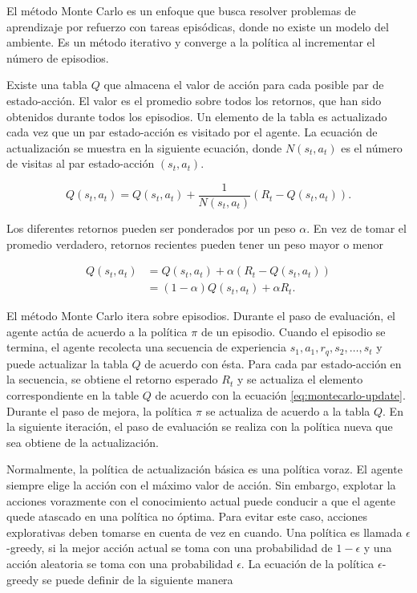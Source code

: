 El método Monte Carlo es un enfoque que busca resolver problemas
de aprendizaje por refuerzo con tareas episódicas, donde 
no existe un modelo del ambiente. 
Es un método iterativo y converge a la política
al incrementar el número de episodios.

Existe una tabla $Q$ que almacena el valor de acción para cada posible
par de estado-acción. El valor es el promedio sobre
todos los retornos, que han sido obtenidos durante todos los episodios. 
Un elemento de la tabla es actualizado cada vez que un par estado-acción
es visitado por el agente. La ecuación de actualización se muestra en la 
siguiente ecuación, donde $N(s_t, a_t)$ es el número de visitas al 
par estado-acción $(s_t, a_t)$.

\[
Q(s_t, a_t) = Q(s_t, a_t) + \frac{1}{N(s_t, a_t)} (R_t - Q(s_t, a_t)).
\]

Los diferentes retornos pueden 
ser ponderados por un peso $\alpha$.
En vez de tomar el promedio
verdadero, retornos recientes pueden tener un peso mayor o menor

\begin{equation}\label{eq:montecarlo-update}
\begin{split}
Q(s_t, a_t) &= Q(s_t, a_t) + \alpha(R_t - Q(s_t, a_t))\\
&= (1-\alpha)Q(s_t, a_t) + \alpha R_t.
\end{split}
\end{equation}

El método Monte Carlo itera sobre episodios. Durante el paso de evaluación, el 
agente actúa de acuerdo a la política $\pi$ de un episodio. Cuando el 
episodio se termina, el agente recolecta una secuencia de experiencia $s_1,a_1,r_q,s_2, \dots, s_t$ y puede actualizar la tabla $Q$ de acuerdo
con ésta.
Para cada par estado-acción en la secuencia, se obtiene el retorno 
esperado $R_t$ y se actualiza el elemento correspondiente en la table $Q$ 
de acuerdo con la ecuación \ref{eq:montecarlo-update}.
Durante el paso de mejora,  la
política $\pi$ se actualiza de acuerdo a la tabla $Q$. En la siguiente iteración,
el paso de evaluación se realiza con la política nueva que sea obtiene de la
actualización.

Normalmente, la política de actualización básica es una política voraz. El agente
siempre elige la acción con el máximo valor de acción. Sin embargo, explotar la acciones vorazmente con el conocimiento actual puede conducir a que el
agente quede atascado en una política no óptima. Para evitar 
este caso, acciones explorativas deben tomarse en cuenta de vez en cuando.
Una política es llamada $\epsilon$-greedy, si la mejor acción actual se toma 
con una probabilidad de $1-\epsilon$ y una acción aleatoria se toma con una 
probabilidad $\epsilon$. La ecuación de la política $\epsilon$-greedy
se puede definir de la siguiente manera

